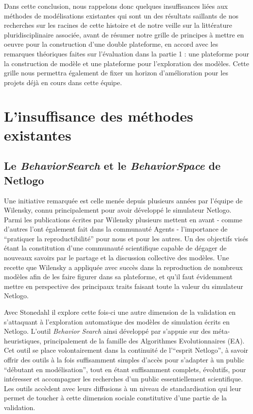 Dans cette conclusion, nous rappelons donc quelques insuffisances liées aux méthodes de modélisations existantes qui sont un des résultats saillants de nos recherches sur les racines de cette histoire et de notre veille sur la littérature pluridisciplinaire associée, avant de résumer notre grille de principes à mettre en oeuvre pour la construction d'une double plateforme, en accord avec les remarques théoriques faites sur l'évaluation dans la partie 1 : une plateforme pour la construction de modèle et une plateforme pour l'exploration des modèles. Cette grille nous permettra également de fixer un horizon d'amélioration pour les projets déjà en cours dans cette équipe. 

\section{L'insuffisance des méthodes existantes}
\label{sec:insuffisance_plateformes}

\subsection{Le \textit{BehaviorSearch} et le \textit{BehaviorSpace} de Netlogo}

Une initiative remarquée est celle menée depuis plusieurs années par l'équipe de Wilensky, connu principalement pour avoir développé le simulateur Netlogo. Parmi les publications écrites par Wilensky plusieurs mettent en avant \autocite{Wilensky2007a} - comme d'autres l'ont également fait dans la communauté Agents \autocites{Rouchier2013, Axtell1996} - l'importance de \enquote{pratiquer la reproductibilité} pour nous et pour les autres. Un des objectifs visés étant la constitution d'une communauté scientifique capable de dégager de nouveaux savoirs par le partage et la discussion collective des modèles. Une recette que Wilensky a appliquée avec succès dans la reproduction de nombreux modèles afin de les faire figurer dans sa plateforme, et qu'il faut évidemment mettre en perspective des principaux traits faisant toute la valeur du simulateur Netlogo. 

Avec Stonedahl \autocites{Stonedahl2011, Stonedahl2011b, Stonedahl2010} il explore cette fois-ci une autre dimension de la validation en s'attaquant à l'exploration automatique des modèles de simulation écrits en Netlogo. L'outil \textit{Behavior Search} ainsi développé par \textcite{Stonedahl2011a} s'appuie sur des méta-heuristiques, principalement de la famille des Algorithmes Evolutionnaires (EA). Cet outil se place volontairement dans la continuité de l'\enquote{esprit Netlogo}, à savoir offrir des outils à la fois suffisamment simples d'accès pour s'adapter à un public \enquote{débutant en modélisation}, tout en étant suffisamment complets, évolutifs, pour intéresser et accompagner les recherches d'un public essentiellement scientifique. Les outils accèdent avec leurs diffusions à un niveau de standardisation qui leur permet de toucher à cette dimension sociale constitutive d'une partie de la validation.


